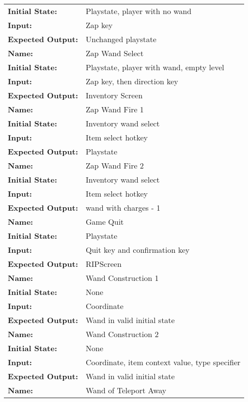 \documentclass[12pt, titlepage]{article}
\begin{document}
\begin{center}
\begin{longtable}{ l | p{10cm} }
				\textbf{Initial State:} & Playstate, player with no wand\\
				\textbf{Input:} & Zap key\\
				\textbf{Expected Output:} & Unchanged playstate\\[1em]
				\hline
				\rule{0pt}{2em}\textbf{Name:} & Zap Wand Select\\
				\textbf{Initial State:} & Playstate, player with wand, empty level \\
				\textbf{Input:} & Zap key, then direction key\\
				\textbf{Expected Output:} & Inventory Screen\\[1em]
				\hline
				\rule{0pt}{2em}\textbf{Name:} & Zap Wand Fire 1\\
				\textbf{Initial State:} & Inventory wand select\\
				\textbf{Input:} & Item select hotkey\\
				\textbf{Expected Output:} & Playstate\\[1em]
				\hline
				\rule{0pt}{2em}\textbf{Name:} & Zap Wand Fire 2\\
				\textbf{Initial State:} & Inventory wand select\\
				\textbf{Input:} & Item select hotkey\\
				\textbf{Expected Output:} & wand with charges - 1\\[1em]
				\hline
				\rule{0pt}{2em}\textbf{Name:} & Game Quit\\
				\textbf{Initial State:} & Playstate\\
				\textbf{Input:} & Quit key and confirmation key\\
				\textbf{Expected Output:} & RIPScreen\\[1em]
				\hline
				\rule{0pt}{2em}\textbf{Name:} & Wand Construction 1\\
				\textbf{Initial State:} & None\\
				\textbf{Input:} & Coordinate\\
				\textbf{Expected Output:} & Wand in valid initial state\\[1em]
				\hline
				\rule{0pt}{2em}\textbf{Name:} & Wand Construction 2\\
				\textbf{Initial State:} & None\\
				\textbf{Input:} & Coordinate, item context value, type specifier\\
				\textbf{Expected Output:} & Wand in valid initial state\\[1em]
				\hline
				\rule{0pt}{2em}\textbf{Name:} & Wand of Teleport Away\\

\end{longtable}
\end{center}
\end{document}
